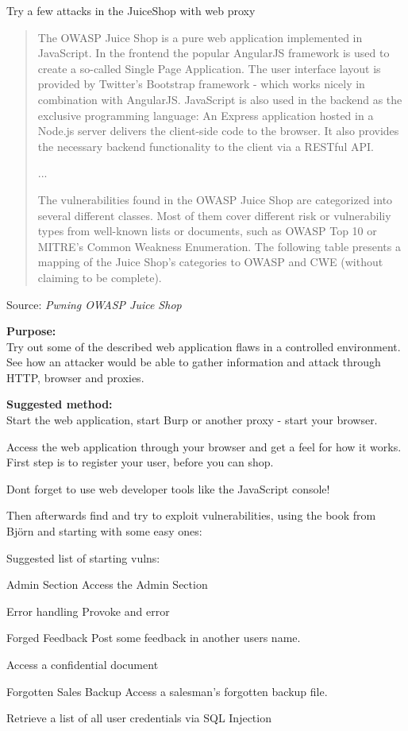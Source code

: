 \documentclass[a4paper,11pt,notitlepage]{report}
\begin{document}
Try a few attacks in the JuiceShop with web proxy

\begin{quote}
The OWASP Juice Shop is a pure web application implemented in JavaScript. In the
frontend the popular AngularJS framework is used to create a so-called Single Page
Application. The user interface layout is provided by Twitter's Bootstrap framework - which
works nicely in combination with AngularJS.
JavaScript is also used in the backend as the exclusive programming language: An Express
application hosted in a Node.js server delivers the client-side code to the browser. It also
provides the necessary backend functionality to the client via a RESTful API.

...

The vulnerabilities found in the OWASP Juice Shop are categorized into several different
classes. Most of them cover different risk or vulnerabiliy types from well-known lists or
documents, such as OWASP Top 10 or MITRE's Common Weakness Enumeration. The
following table presents a mapping of the Juice Shop's categories to OWASP and CWE
(without claiming to be complete).
\end{quote}

Source: \emph{Pwning OWASP Juice Shop}


 {\bf Purpose:}\\
 Try out some of the described web application flaws in a controlled environment. See how an attacker would be able to gather information and attack through HTTP, browser and proxies.

 {\bf Suggested method:}\\
Start the web application, start Burp or another proxy - start your browser.

Access the web application through your browser and get a feel for how it works. First step is to register your user, before you can shop.

Dont forget to use web developer tools like the JavaScript console!

Then afterwards find and try to exploit vulnerabilities, using the book from Björn and starting with some easy ones:

Suggested list of starting vulns:
\begin{list2}
\item Admin Section Access the Admin Section
\item Error handling Provoke and error
\item Forged Feedback Post some feedback in another users name.
\item Access a confidential document
\item Forgotten Sales Backup Access a salesman's forgotten backup file.
\item Retrieve a list of all user credentials via SQL Injection
\end{list2}
\end{document}

